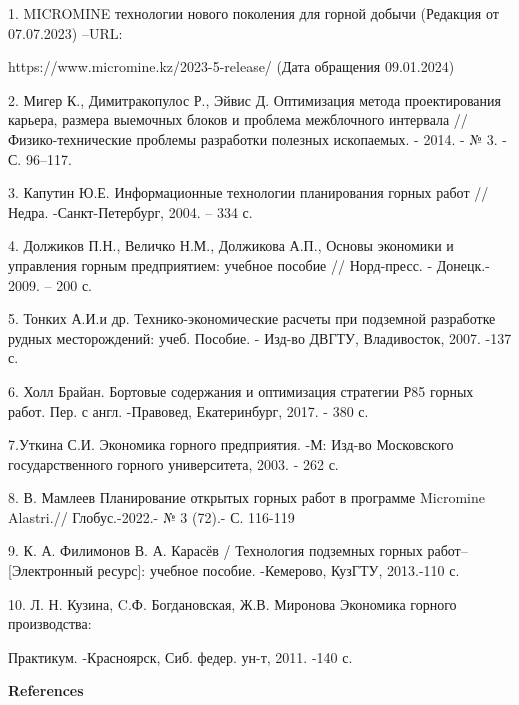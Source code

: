 \begin{noparindent}
1. MICROMINE технологии нового поколения для горной добычи (Редакция от
07.07.2023) --URL:

https://www.micromine.kz/2023-5-release/ (Дата
обращения 09.01.2024)

2. Мигер К., Димитракопулос Р., Эйвис Д. Оптимизация метода
проектирования карьера, размера выемочных блоков и проблема межблочного
интервала //Физико-технические проблемы разработки полезных ископаемых.
- 2014. - № 3. - С. 96--117.

3. Капутин Ю.Е. Информационные технологии планирования горных работ //
Недра. -Санкт-Петербург, 2004. -- 334 с.

4. Должиков П.Н., Величко Н.М., Должикова А.П., Основы экономики и
управления горным предприятием: учебное пособие // Норд-пресс. -
Донецк.- 2009. -- 200 с.

5. Тонких А.И.и др. Технико-экономические расчеты при подземной
разработке рудных месторождений: учеб. Пособие. - Изд-во ДВГТУ,
Владивосток, 2007. -137 с.

6. Холл Брайан. Бортовые содержания и оптимизация стратегии Р85 горных
работ. Пер. с англ. -Правовед, Екатеринбург, 2017. - 380 с.

7.Уткина С.И. Экономика горного предприятия. -М: Изд-во Московского
государственного горного университета, 2003. - 262 с.

8. В. Мамлеев Планирование открытых горных работ в программе Micromine
Alastri.// Глобус.-2022.- № 3 (72).- С. 116-119

9. К. А. Филимонов В. А. Карасёв / Технология подземных горных работ--
{[}Электронный ресурс{]}: учебное пособие. -Кемерово, КузГТУ, 2013.-110
с.

10. Л. Н. Кузина, C.Ф. Богдановская, Ж.В. Миронова Экономика горного
производства:

Практикум. -Красноярск, Сиб. федер. ун-т, 2011. -140 с.
\end{noparindent}

\begin{center}
{\bfseries References}
\end{center}

